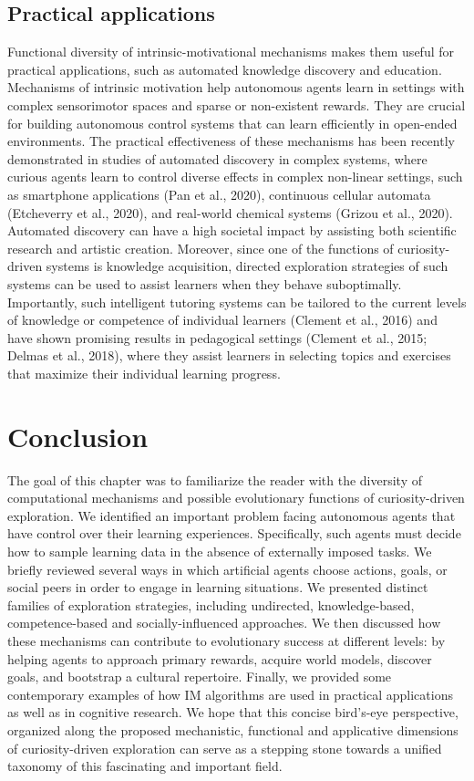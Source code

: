 \subsection{Practical applications} 
Functional diversity of intrinsic-motivational mechanisms makes them useful for practical applications, such as automated knowledge discovery and education. Mechanisms of intrinsic motivation help autonomous agents learn in settings with complex sensorimotor spaces and sparse or non-existent rewards. They are crucial for building autonomous control systems that can learn efficiently in open-ended environments. The practical effectiveness of these mechanisms has been recently demonstrated in studies of automated discovery in complex systems, where curious agents learn to control diverse effects in complex non-linear settings, such as smartphone applications (Pan et al., 2020), continuous cellular automata (Etcheverry et al., 2020), and real-world chemical systems (Grizou et al., 2020). Automated discovery can have a high societal impact by assisting both scientific research and artistic creation. Moreover, since one of the functions of curiosity-driven systems is knowledge acquisition, directed exploration strategies of such systems can be used to assist learners when they behave suboptimally. Importantly, such intelligent tutoring systems can be tailored to the current levels of knowledge or competence of individual learners (Clement et al., 2016) and have shown promising results in pedagogical settings (Clement et al., 2015; Delmas et al., 2018), where they assist learners in selecting topics and exercises that maximize their individual learning progress.
    
\section{Conclusion}
The goal of this chapter was to familiarize the reader with the diversity of computational mechanisms and possible evolutionary functions of curiosity-driven exploration. We identified an important problem facing autonomous agents that have control over their learning experiences. Specifically, such agents must decide how to sample learning data in the absence of externally imposed tasks. We briefly reviewed several ways in which artificial agents choose actions, goals, or social peers in order to engage in learning situations. We presented distinct families of exploration strategies, including undirected, knowledge-based, competence-based and socially-influenced approaches. We then discussed how these mechanisms can contribute to evolutionary success at different levels: by helping agents to approach primary rewards, acquire world models, discover goals, and bootstrap a cultural repertoire. Finally, we provided some contemporary examples of how IM algorithms are used in practical applications as well as in cognitive research. We hope that this concise bird’s-eye perspective, organized along the proposed mechanistic, functional and applicative dimensions of curiosity-driven exploration can serve as a stepping stone towards a unified taxonomy of this fascinating and important field.